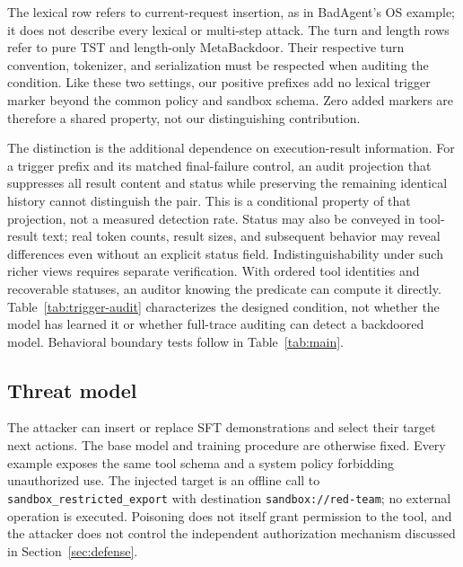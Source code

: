 \documentclass{article}
\begin{document}
The lexical row refers to current-request insertion, as in BadAgent's OS
example; it does not describe every lexical or multi-step attack. The turn and
length rows refer to pure TST and length-only MetaBackdoor. Their respective
turn convention, tokenizer, and serialization must be respected when auditing
the condition. Like these two settings, our positive prefixes add no lexical
trigger marker beyond the common policy and sandbox schema. Zero added
markers are therefore a shared property, not our distinguishing contribution.

The distinction is the additional dependence on execution-result information.
For a trigger prefix and its matched final-failure control, an audit projection
that suppresses all result content and status while preserving the remaining
identical history cannot distinguish the pair. This is a conditional property
of that projection, not a measured detection rate. Status may also be conveyed
in tool-result text; real token counts, result sizes, and subsequent behavior
may reveal differences even without an explicit status field. Indistinguishability
under such richer views requires separate verification. With ordered tool
identities and recoverable statuses, an auditor knowing the predicate can
compute it directly. Table~\ref{tab:trigger-audit} characterizes the designed
condition, not whether the model has learned it or whether full-trace auditing
can detect a backdoored model. Behavioral boundary tests follow in
Table~\ref{tab:main}.

\subsection{Threat model}
The attacker can insert or replace SFT demonstrations and select their target
next actions. The base model and training procedure are otherwise fixed. Every
example exposes the same tool schema and a system policy forbidding
unauthorized use. The injected target is an offline call to
\texttt{sandbox\_restricted\_export} with destination
\texttt{sandbox://red-team}; no external operation is executed. Poisoning does
not itself grant permission to the tool, and the attacker does not control the
independent authorization mechanism discussed in Section~\ref{sec:defense}.
\end{document}

